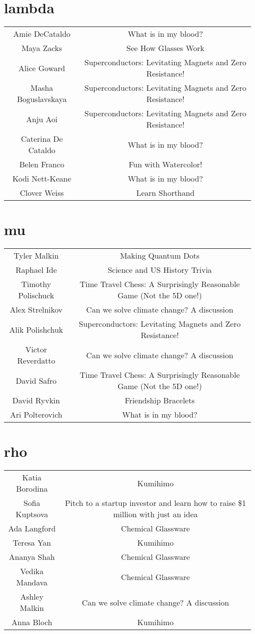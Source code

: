 \documentclass{article}
\begin{document}
\section*{lambda}
\setlength{\tabcolsep}{60pt}
\begin{tabular}{c c}
Amie DeCataldo & What is in my blood? \\
Maya Zacks & See How Glasses Work \\
Alice Goward & Superconductors: Levitating Magnets and Zero Resistance! \\
Masha Boguslavskaya & Superconductors: Levitating Magnets and Zero Resistance! \\
Anju Aoi & Superconductors: Levitating Magnets and Zero Resistance! \\
Caterina De Cataldo & What is in my blood? \\
Belen Franco & Fun with Watercolor! \\
Kodi Nett-Keane & What is in my blood? \\
Clover Weiss & Learn Shorthand \\
\end{tabular}
\section*{mu}
\setlength{\tabcolsep}{60pt}
\begin{tabular}{c c}
Tyler Malkin & Making Quantum Dots \\
Raphael Ide & Science and US History Trivia \\
Timothy Polischuck & Time Travel Chess: A Surprisingly Reasonable Game (Not the 5D one!) \\
Alex Strelnikov & Can we solve climate change? A discussion \\
Alik Polishchuk & Superconductors: Levitating Magnets and Zero Resistance! \\
Victor Reverdatto & Can we solve climate change? A discussion \\
David Safro & Time Travel Chess: A Surprisingly Reasonable Game (Not the 5D one!) \\
David Ryvkin & Friendship Bracelets \\
Ari Polterovich & What is in my blood? \\
\end{tabular}
\section*{rho}
\setlength{\tabcolsep}{60pt}
\begin{tabular}{c c}
Katia Borodina & Kumihimo \\
Sofia Kuptsova & Pitch to a startup investor and learn how to raise \$1 million with just an idea \\
Ada Langford & Chemical Glassware \\
Teresa Yan & Kumihimo \\
Ananya Shah & Chemical Glassware \\
Vedika Mandava & Chemical Glassware \\
Ashley Malkin & Can we solve climate change? A discussion \\
Anna Bloch & Kumihimo \\
\end{tabular}
\end{document}
